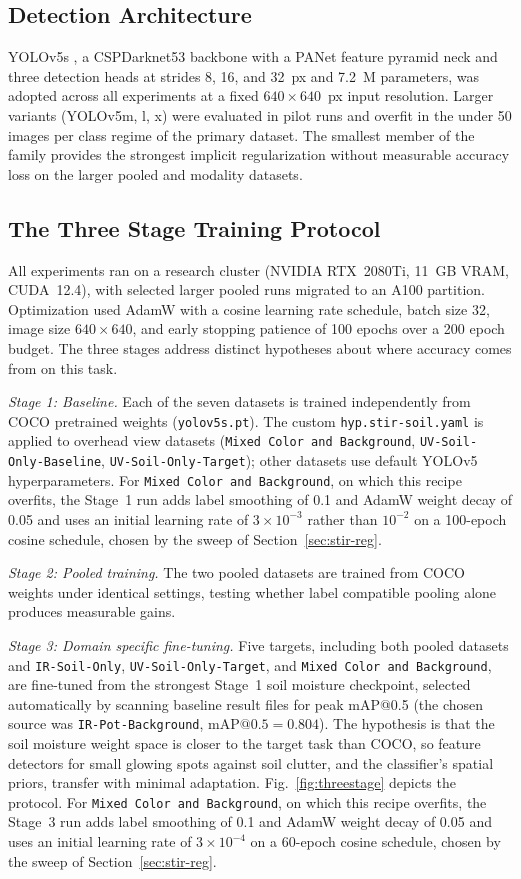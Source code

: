﻿\documentclass[journal]{IEEEtran}
\begin{document}
\subsection{Detection Architecture}
YOLOv5s \cite{jocher2020yolov5}, a CSPDarknet53 backbone with a PANet feature pyramid neck and three detection heads at strides 8, 16, and 32~px and 7.2~M parameters, was adopted across all experiments at a fixed $640 \times 640$~px input resolution. Larger variants (YOLOv5m, l, x) were evaluated in pilot runs and overfit in the under 50 images per class regime of the primary dataset. The smallest member of the family provides the strongest implicit regularization without measurable accuracy loss on the larger pooled and modality datasets.

\subsection{The Three Stage Training Protocol}
All experiments ran on a research cluster (NVIDIA RTX~2080Ti, 11~GB VRAM, CUDA~12.4), with selected larger pooled runs migrated to an A100 partition. Optimization used AdamW with a cosine learning rate schedule, batch size 32, image size $640 \times 640$, and early stopping patience of 100 epochs over a 200 epoch budget. The three stages address distinct hypotheses about where accuracy comes from on this task.

\emph{Stage 1: Baseline.} Each of the seven datasets is trained independently from COCO pretrained weights (\texttt{yolov5s.pt}). The custom \texttt{hyp.stir-soil.yaml} is applied to overhead view datasets (\texttt{Mixed Color and Background}, \texttt{UV-Soil-Only-Baseline}, \texttt{UV-Soil-Only-Target}); other datasets use default YOLOv5 hyperparameters. For \texttt{Mixed Color and Background}, on which this recipe overfits, the Stage~1 run adds label smoothing of 0.1 and AdamW weight decay of 0.05 and uses an initial learning rate of $3 \times 10^{-3}$ rather than $10^{-2}$ on a 100-epoch cosine schedule, chosen by the sweep of Section~\ref{sec:stir-reg}.

\emph{Stage 2: Pooled training.} The two pooled datasets are trained from COCO weights under identical settings, testing whether label compatible pooling alone produces measurable gains.

\emph{Stage 3: Domain specific fine-tuning.} Five targets, including both pooled datasets and \texttt{IR-Soil-Only}, \texttt{UV-Soil-Only-Target}, and \texttt{Mixed Color and Background}, are fine-tuned from the strongest Stage~1 soil moisture checkpoint, selected automatically by scanning baseline result files for peak mAP@0.5 (the chosen source was \texttt{IR-Pot-Background}, $\text{mAP@0.5}=0.804$). The hypothesis is that the soil moisture weight space is closer to the target task than COCO, so feature detectors for small glowing spots against soil clutter, and the classifier's spatial priors, transfer with minimal adaptation. Fig.~\ref{fig:threestage} depicts the protocol. For \texttt{Mixed Color and Background}, on which this recipe overfits, the Stage~3 run adds label smoothing of 0.1 and AdamW weight decay of 0.05 and uses an initial learning rate of $3 \times 10^{-4}$ on a 60-epoch cosine schedule, chosen by the sweep of Section~\ref{sec:stir-reg}.
\end{document}
